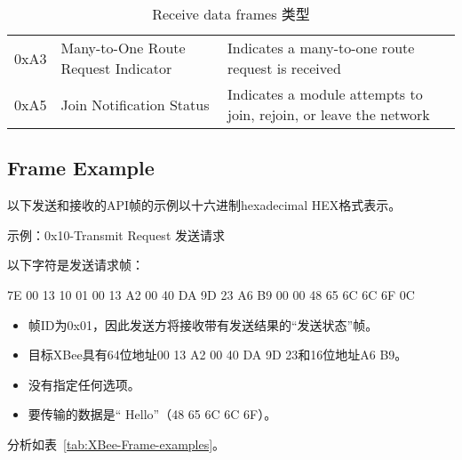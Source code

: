 \begin{table}[htbp]
\begin{tabular}{@{}lll@{}}
    0xA3   & Many-to-One Route Request Indicator & Indicates a many-to-one route request is received                                                    \\
    0xA5   & Join Notification Status            & Indicates a module attempts to join, rejoin, or leave the network                                    \\ \bottomrule
    \end{tabular}
    \caption{Receive data frames 类型}
    \label{tab:XBee-Receive-data-frames}
\end{table}

\subsection{Frame Example}

以下发送和接收的API帧的示例以十六进制hexadecimal HEX格式表示。

示例：0x10-Transmit Request 发送请求

以下字符是发送请求帧：

7E 00 13 10 01 00 13 A2 00 40 DA 9D 23 A6 B9 00 00 48 65 6C 6C 6F 0C

\begin{itemize}
    \item 帧ID为0x01，因此发送方将接收带有发送结果的“发送状态”帧。
    \item 目标XBee具有64位地址00 13 A2 00 40 DA 9D 23和16位地址A6 B9。
    \item 没有指定任何选项。
    \item 要传输的数据是“ Hello”（48 65 6C 6C 6F）。
\end{itemize}

分析如表~\ref{tab:XBee-Frame-examples}。

